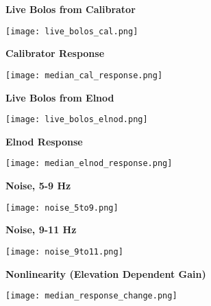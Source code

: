\documentclass{article}
\newcommand{\figtitle}[1]{
  {
    \centering
    \Huge\textbf{#1}
    \par\medskip
  }
}
\begin{document}
\begin{figure}
    \figtitle{Live Bolos from Calibrator}
    \texttt{[image: live\_bolos\_cal.png]}
\end{figure}
\begin{figure}
  \figtitle{Calibrator Response}
  \texttt{[image: median\_cal\_response.png]}
\end{figure}
\begin{figure}
  \figtitle{Live Bolos from Elnod}
  \texttt{[image: live\_bolos\_elnod.png]}
\end{figure}
\begin{figure}
  \figtitle{Elnod Response}
  \texttt{[image: median\_elnod\_response.png]}
\end{figure}
\begin{figure}
  \figtitle{Noise, 5-9 Hz}
  \texttt{[image: noise\_5to9.png]}
\end{figure}
\begin{figure}
  \figtitle{Noise, 9-11 Hz}
  \texttt{[image: noise\_9to11.png]}
\end{figure}
\begin{figure}
  \figtitle{Nonlinearity (Elevation Dependent Gain)}
  \texttt{[image: median\_response\_change.png]}
\end{figure}
\end{document}

